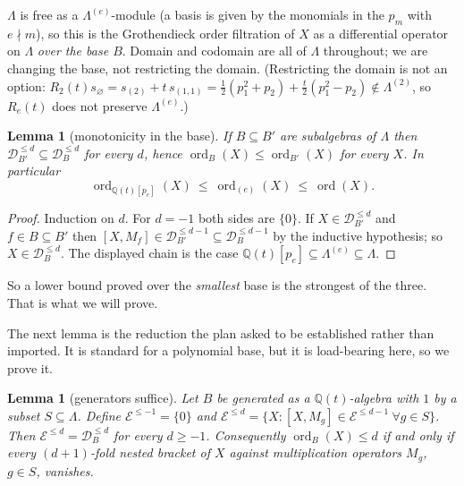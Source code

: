 \documentclass[11pt]{article}
\newtheorem{lemma}[theorem]{Lemma}
\theoremstyle{definition}
\DeclareMathOperator{\ord}{ord}
\newcommand{\Q}{\mathbb{Q}}
\newcommand{\Lam}{\Lambda}
\newcommand{\D}{\mathcal{D}}
\begin{document}
$\Lam$ is free as a $\Lam^{(e)}$-module (a basis is given by the monomials in the $p_m$
with $e\nmid m$), so this is the Grothendieck order filtration of $X$ as a differential
operator on $\Lam$ \emph{over the base $B$}.  Domain and codomain are all of $\Lam$
throughout; we are changing the base, not restricting the domain.  (Restricting the domain
is not an option: $R_2(t)s_\varnothing=s_{(2)}+t\,s_{(1,1)}=\tfrac12(p_1^2+p_2)+\tfrac
t2(p_1^2-p_2)\notin\Lam^{(2)}$, so $R_e(t)$ does not preserve $\Lam^{(e)}$.)

\begin{lemma}[monotonicity in the base]\label{lem:mono}
If $B\subseteq B'$ are subalgebras of $\Lam$ then $\D^{\le d}_{B'}\subseteq\D^{\le d}_{B}$
for every $d$, hence $\ord_{B}(X)\le\ord_{B'}(X)$ for every $X$.  In particular
\[
  \ord_{\Q(t)[p_e]}(X)\ \le\ \ord_{(e)}(X)\ \le\ \ord(X).
\]
\end{lemma}

\begin{proof}
Induction on $d$.  For $d=-1$ both sides are $\{0\}$.  If $X\in\D^{\le d}_{B'}$ and $f\in
B\subseteq B'$ then $[X,M_f]\in\D^{\le d-1}_{B'}\subseteq\D^{\le d-1}_{B}$ by the inductive
hypothesis; so $X\in\D^{\le d}_{B}$.  The displayed chain is the case
$\Q(t)[p_e]\subseteq\Lam^{(e)}\subseteq\Lam$.
\end{proof}

So a lower bound proved over the \emph{smallest} base is the strongest of the three.  That
is what we will prove.

The next lemma is the reduction the plan asked to be established rather than imported.  It
is standard for a polynomial base, but it is load-bearing here, so we prove it.

\begin{lemma}[generators suffice]\label{lem:gen}
Let $B$ be generated as a $\Q(t)$-algebra with $1$ by a subset $S\subseteq\Lam$.  Define
$\mathcal E^{\le-1}=\{0\}$ and $\mathcal E^{\le d}=\{X:[X,M_g]\in\mathcal E^{\le d-1}\
\forall g\in S\}$.  Then $\mathcal E^{\le d}=\D^{\le d}_B$ for every $d\ge-1$.
Consequently $\ord_B(X)\le d$ if and only if every $(d+1)$-fold nested bracket of $X$
against multiplication operators $M_g$, $g\in S$, vanishes.
\end{lemma}
\end{document}
